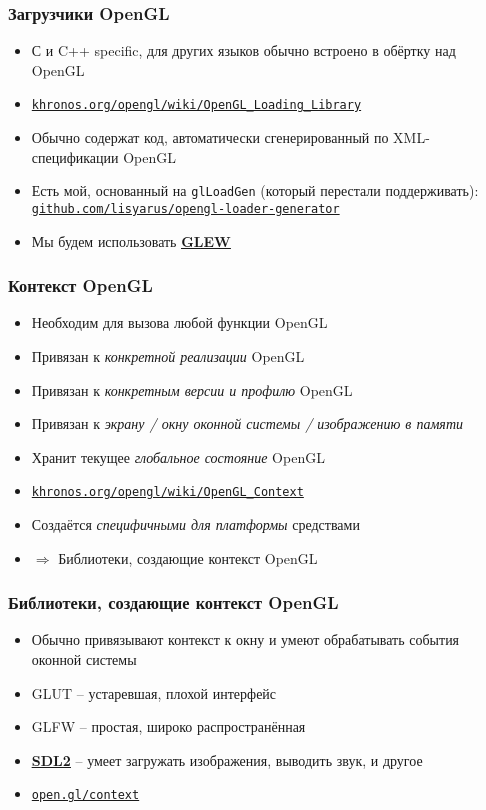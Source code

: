 \documentclass[10pt]{beamer}
\begin{document}
\begin{frame}[fragile]
\frametitle{Загрузчики OpenGL}
\begin{itemize}
\item С и C++ specific, для других языков обычно встроено в обёртку над OpenGL
\item \href{https://khronos.org/opengl/wiki/OpenGL_Loading_Library}{\nolinkurl{khronos.org/opengl/wiki/OpenGL\_Loading\_Library}}
\item Обычно содержат код, автоматически сгенерированный по XML-спецификации OpenGL
\item Есть мой, основанный на \verb|glLoadGen| (который перестали поддерживать): \href{https://github.com/lisyarus/opengl-loader-generator}{\nolinkurl{github.com/lisyarus/opengl-loader-generator}}
\item Мы будем использовать \href{http://glew.sourceforge.net/}{\alert{\textbf{\underline{GLEW}}}}
\end{itemize}
\end{frame}

\begin{frame}
\frametitle{Контекст OpenGL}
\begin{itemize}
\item Необходим для вызова любой функции OpenGL
\item Привязан к \textit{конкретной реализации} OpenGL
\item Привязан к \textit{конкретным версии и профилю} OpenGL
\item Привязан к \textit{экрану / окну оконной системы / изображению в памяти}
\item Хранит текущее \textit{глобальное состояние} OpenGL
\item \href{https://khronos.org/opengl/wiki/OpenGL_Context}{\nolinkurl{khronos.org/opengl/wiki/OpenGL\_Context}}
\item Создаётся \textit{специфичными для платформы} средствами
\item $\Longrightarrow$ Библиотеки, создающие контекст OpenGL
\end{itemize}
\end{frame}

\begin{frame}
\frametitle{Библиотеки, создающие контекст OpenGL}
\begin{itemize}
\item Обычно привязывают контекст к окну и умеют обрабатывать события оконной системы
\item GLUT -- устаревшая, плохой интерфейс
\item GLFW -- простая, широко распространённая
\item \href{https://www.libsdl.org/}{\alert{\textbf{\underline{SDL2}}}} -- умеет загружать изображения, выводить звук, и другое
\item \href{https://open.gl/context}{\nolinkurl{open.gl/context}}
\end{itemize}
\end{frame}
\end{document}
